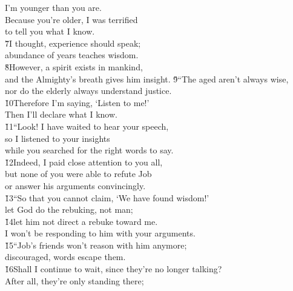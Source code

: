 \begin{poetry}
\poeml I'm younger than you are. \\
\poemll    Because you're older, I was terrified \\
\poemlll       to tell you what I know. \\
\poeml \v{7}I thought, experience should speak; \\
\poemll    abundance of years teaches wisdom. \\
\poeml \v{8}However, a spirit exists in mankind, \\
\poemll    and the Almighty's breath gives him insight.
\poeml \v{9}``The aged aren't always wise, \\
\poemll    nor do the elderly always understand justice. \\
\poeml \v{10}Therefore I'm saying, `Listen to me!' \\
\poemll    Then I'll declare what I know. \\
\poeml \v{11}``Look! I have waited to hear your speech, \\
\poemll    so I listened to your insights \\
\poemlll       while you searched for the right words to say. \\
\poeml \v{12}Indeed, I paid close attention to you all, \\
\poemll    but none of you were able to refute Job \\
\poemlll       or answer his arguments convincingly. \\
\poeml \v{13}``So that you cannot claim, `We have found wisdom!' \\
\poemll    let God do the rebuking, not man; \\
\poeml \v{14}let him not direct a rebuke toward me. \\
\poemll    I won't be responding to him with your arguments. \\
\poeml \v{15}``Job's friends won't reason with him anymore; \\
\poemll    discouraged, words escape them. \\
\poeml \v{16}Shall I continue to wait, since they're no longer talking? \\
\poemll    After all, they're only standing there; \\

\end{poetry}
